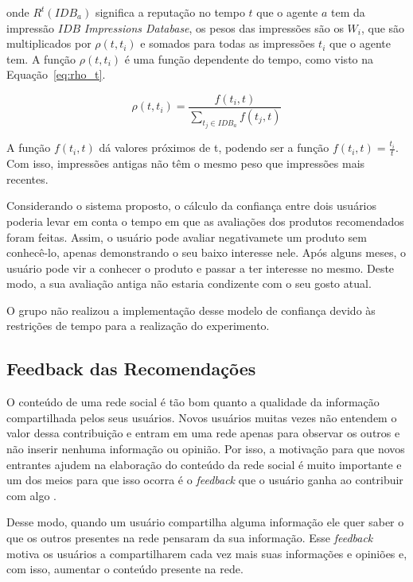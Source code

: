  onde $R^t(IDB_a)$ significa a reputação no tempo $t$ que o agente $a$ tem da impressão $IDB$ \textit{Impressions Database}, os pesos das impressões são os $W_i$, que são multiplicados por $\rho(t,t_i)$ e somados para todas as impressões $t_i$ que o agente tem. A função $\rho(t,t_i)$ é uma função dependente do tempo, como visto na Equação~\ref{eq:rho_t}.
 
\begin{equation}
 \rho(t,t_i) = \frac{f(t_i,t)}{{\sum_{t_j\in{IDB_a}}}f(t_j,t)}
 \label{eq:rho_t} 
\end{equation}

 A função $f(t_i,t)$ dá valores próximos de t, podendo ser a função $f(t_i,t) = \frac{t_i}{t}$. Com isso, impressões antigas não têm o mesmo peso que impressões mais recentes.

 Considerando o sistema proposto, o cálculo da confiança entre dois usuários poderia levar em conta o tempo em que as avaliações dos produtos recomendados foram feitas. Assim, o usuário pode avaliar negativamete um produto sem conhecê-lo, apenas demonstrando o seu baixo interesse nele. Após alguns meses, o usuário pode vir a conhecer o produto e passar a ter interesse no mesmo. Deste modo, a sua avaliação antiga não estaria condizente com o seu gosto atual.
 
 O grupo não realizou a implementação desse modelo de confiança devido às restrições de tempo para a realização do experimento.


\subsection{Feedback das Recomendações} %
\label{sub:feedback_das_recomendacoes}

 O conteúdo de uma rede social é tão bom quanto a qualidade da informação compartilhada pelos seus usuários. Novos usuários muitas vezes não entendem o valor dessa contribuição e entram em uma rede apenas para observar os outros e não inserir nenhuma informação ou opinião. Por isso, a motivação para que novos entrantes ajudem na elaboração do conteúdo da rede social é muito importante e um dos meios para que isso ocorra é o \textit{feedback} que o usuário ganha ao contribuir com algo \cite{burke2009fmm}.
 
 Desse modo, quando um usuário compartilha alguma informação ele quer saber o que os outros presentes na rede pensaram da sua informação. Esse \textit{feedback} motiva os usuários a compartilharem cada vez mais suas informações e opiniões e, com isso, aumentar o conteúdo presente na rede.
 
